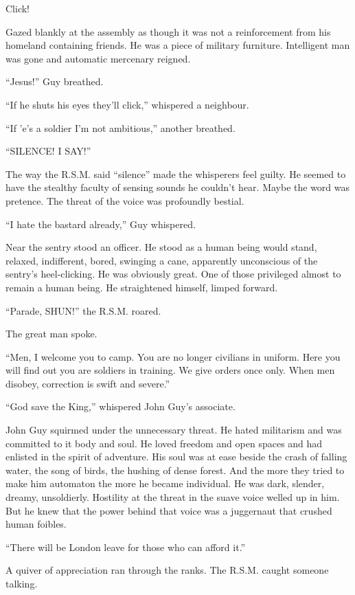 Click!

Gazed blankly at the assembly as though it was not a reinforcement from his 
homeland containing friends. He was a piece of military furniture. Intelligent 
man was gone and automatic mercenary reigned.

``Jesus!'' Guy breathed.

``If he shuts his eyes they'll click,'' whispered a neighbour.

``If 'e's a soldier I'm not ambitious,'' another breathed.

``SILENCE! I SAY!''

The way the R.S.M. said ``silence'' made the whisperers feel guilty. He seemed 
to have the stealthy faculty of sensing sounds he couldn't hear. Maybe the 
word was pretence. The threat of the voice was profoundly bestial.

``I hate the bastard already,'' Guy whispered.

Near the sentry stood an officer. He stood as a human being would stand, 
relaxed, indifferent, bored, swinging a cane, apparently unconscious of 
the sentry's heel-clicking. He was obviously great. One of those 
privileged almost to remain a human being. He straightened himself, 
limped forward.

``Parade, SHUN!'' the R.S.M. roared.

The great man spoke.

``Men, I welcome you to camp. You are no longer civilians in uniform. 
Here you will find out you are soldiers in training. We give orders 
once only. When men disobey, correction is swift and severe.''

``God save the King,'' whispered John Guy's associate.

John Guy squirmed under the unnecessary threat. He hated militarism and 
was committed to it body and soul. He loved freedom and open spaces 
and had enlisted in the spirit of adventure. His soul was at ease 
beside the crash of falling water, the song of birds, the hushing 
of dense forest. And the more they tried to make him automaton 
the more he became individual. He was dark, slender, dreamy, 
unsoldierly. Hostility at the threat in the suave voice welled 
up in him. But he knew that the power behind that voice was 
a juggernaut that crushed human foibles.

``There will be London leave for those who can afford it.''

A quiver of appreciation ran through the ranks. The R.S.M. caught 
someone talking.

